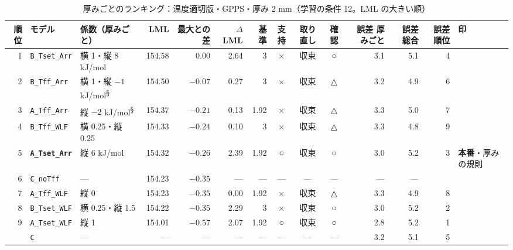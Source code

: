 \documentclass[paper=a4paper,landscape,fontsize=10pt,line_length=62zw,number_of_lines=34]{jlreq}
\let\origtextbf\textbf
\renewcommand{\textbf}[1]{\origtextbf{\gtfamily #1}}   %
\begin{document}
\begin{table}[H]\centering\footnotesize
\caption{厚みごとのランキング：温度適切版・GPPS・厚み 2 mm（学習の条件 12。LML の大きい順）}
\begin{tabular}{rlp{11\zw}rrrrccc rrrl}
\toprule
順位 & モデル & 係数（厚みごと） & LML & 最大との差 & $\Delta$LML & 基準 & 支持 & 取り直し & 確認 & 誤差 厚みごと & 誤差 総合 & 誤差順位 & 印 \\
\midrule
1 & \texttt{B\_\allowbreak{}Tset\_\allowbreak{}Arr} & 横 1・縦 8 kJ/mol & 154.58 & 0.00 & 2.64 & 3 & × & 収束 & ○ & 3.1 & 5.1 & 4 &  \\
2 & \texttt{B\_\allowbreak{}Tff\_\allowbreak{}Arr} & 横 1・縦 $-1$ kJ/mol\textsuperscript{§} & 154.50 & $-0.07$ & 0.27 & 3 & × & 収束 & △ & 3.2 & 4.9 & 6 &  \\
3 & \texttt{A\_\allowbreak{}Tff\_\allowbreak{}Arr} & 縦 $-2$ kJ/mol\textsuperscript{§} & 154.37 & $-0.21$ & 0.13 & 1.92 & × & 収束 & △ & 3.3 & 5.0 & 7 &  \\
4 & \texttt{B\_\allowbreak{}Tff\_\allowbreak{}WLF} & 横 0.25・縦 0.25 & 154.33 & $-0.24$ & 0.10 & 3 & × & 収束 & △ & 3.3 & 4.8 & 9 &  \\
5 & \textbf{\texttt{A\_\allowbreak{}Tset\_\allowbreak{}Arr}} & 縦 6 kJ/mol & 154.32 & $-0.26$ & 2.39 & 1.92 & ○ & 収束 & ○ & 3.0 & 5.2 & 3 & \textbf{本番}・厚みの規則 \\
6 & \texttt{C\_\allowbreak{}noTff} & --- & 154.23 & $-0.35$ & --- & --- & --- & --- & --- & --- & --- &  &  \\
7 & \texttt{A\_\allowbreak{}Tff\_\allowbreak{}WLF} & 縦 0 & 154.23 & $-0.35$ & 0.00 & 1.92 & × & 収束 & △ & 3.3 & 4.9 & 8 &  \\
8 & \texttt{B\_\allowbreak{}Tset\_\allowbreak{}WLF} & 横 0.25・縦 1.5 & 154.22 & $-0.35$ & 2.29 & 3 & × & 収束 & ○ & 3.0 & 5.2 & 2 &  \\
9 & \texttt{A\_\allowbreak{}Tset\_\allowbreak{}WLF} & 縦 1 & 154.01 & $-0.57$ & 2.07 & 1.92 & ○ & 収束 & ○ & 2.8 & 5.2 & 1 &  \\
 & \texttt{C} & --- & --- & --- & --- & --- & --- & --- & --- & 3.2 & 5.1 & 5 &  \\
\bottomrule
\end{tabular}
\end{table}
\end{document}
